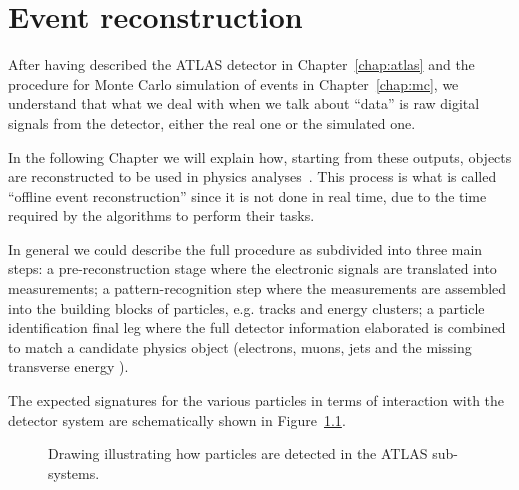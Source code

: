 \clearpage{\pagestyle{empty}\cleardoublepage}

\chapter{Event reconstruction}\label{chap:objects}

After having described the ATLAS detector in Chapter~\ref{chap:atlas} 
and the procedure for Monte Carlo simulation of events in Chapter~\ref{chap:mc},
we understand that what we deal with when we talk about ``data'' 
is raw digital signals from the detector,
either the real one or the simulated one.

In the following Chapter we will explain how, starting from these outputs,
objects are reconstructed to be used in physics analyses~\cite{Aad:2009wy}. 
This process is what is called ``offline event reconstruction'' since
it is not done in real time, due to the time required by the algorithms
to perform their tasks.

In general we could describe the full procedure as subdivided into
three main steps: a pre-reconstruction stage where the electronic signals are
translated into measurements; a pattern-recognition step where the measurements
are assembled into the building blocks of particles, e.g. tracks and energy clusters;
a particle identification final leg where the full detector information elaborated 
is combined to match a candidate physics object 
(electrons, muons, jets and the missing transverse energy \met).

The expected signatures for the various particles in terms of interaction
with the detector system are schematically shown in Figure~\ref{fig:decaychart}.

\begin{figure}[tb]\begin{center}
	\caption{Drawing illustrating how particles are detected in the ATLAS sub-systems.
	\label{fig:decaychart}}
\end{center}\end{figure}

